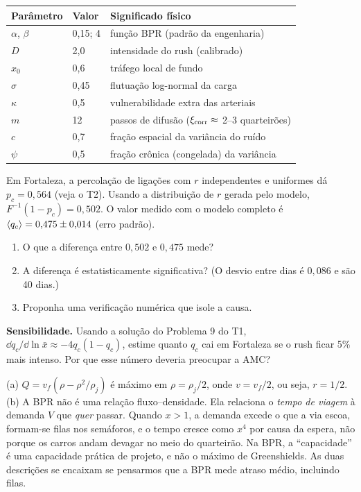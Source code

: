 \documentclass[11pt]{article}
\begin{document}
\begin{center}
\renewcommand{\arraystretch}{1.15}
\begin{tabular}{lll}
\toprule
Parâmetro & Valor & Significado físico\\
\midrule
$\alpha$, $\beta$ & 0,15; 4 & função BPR (padrão da engenharia)\\
$D$ & 2,0 & intensidade do rush (calibrado)\\
$x_0$ & 0,6 & tráfego local de fundo\\
$\sigma$ & 0,45 & flutuação log-normal da carga\\
$\kappa$ & 0,5 & vulnerabilidade extra das arteriais\\
$m$ & 12 & passos de difusão ($\xi_{\rm corr}\approx$ 2--3 quarteirões)\\
$c$ & 0,7 & fração espacial da variância do ruído\\
$\psi$ & 0,5 & fração crônica (congelada) da variância\\
\bottomrule
\end{tabular}
\end{center}

 Em Fortaleza, a percolação de ligações com $r$ independentes e uniformes dá $p_c = 0{,}564$ (veja o T2). Usando a distribuição de $r$ gerada pelo modelo, $F^{-1}(1-p_c) = 0{,}502$. O valor medido com o modelo completo é $\left\langle q_c \right\rangle = 0{,}475\pm0{,}014$ (erro padrão).
\begin{enumerate}
  \item O que a diferença entre $0{,}502$ e $0{,}475$ mede?
  \item A diferença é estatisticamente significativa? (O desvio entre dias é $0{,}086$ e são 40 dias.)
  \item Proponha uma verificação numérica que isole a causa.
\end{enumerate}

 \textbf{Sensibilidade.} Usando a solução do Problema 9 do T1, $\dd q_c/\dd\ln\bar x\approx-4q_c(1-q_c)$, estime quanto $q_c$ cai em Fortaleza se o rush ficar 5\% mais intenso. Por que esse número deveria preocupar a AMC?

\solucoes

(a) $Q = v_f(\rho-\rho^2/\rho_j)$ é máximo em $\rho=\rho_j/2$, onde $v = v_f/2$, ou seja, $r=1/2$. (b) A BPR não é uma relação fluxo--densidade. Ela relaciona o \emph{tempo de viagem} à demanda $V$ que \emph{quer} passar. Quando $x>1$, a demanda excede o que a via escoa, formam-se filas nos semáforos, e o tempo cresce como $x^4$ por causa da espera, não porque os carros andam devagar no meio do quarteirão. Na BPR, a ``capacidade'' é uma capacidade prática de projeto, e não o máximo de Greenshields. As duas descrições se encaixam se pensarmos que a BPR mede atraso médio, incluindo filas.
\end{document}
